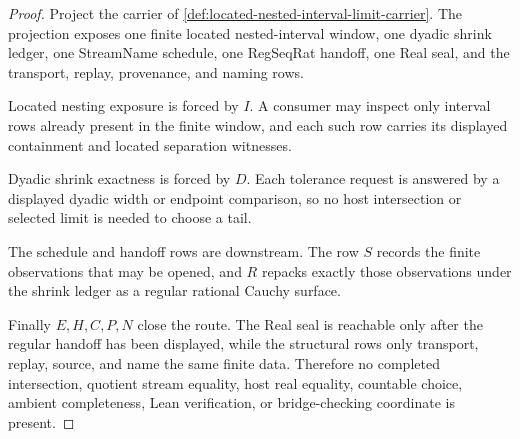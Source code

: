 \begin{proof}
Project the carrier of \autoref{def:located-nested-interval-limit-carrier}. The projection exposes one finite located nested-interval window, one dyadic shrink ledger, one StreamName schedule, one RegSeqRat handoff, one Real seal, and the transport, replay, provenance, and naming rows.

Located nesting exposure is forced by $I$. A consumer may inspect only interval rows already present in the finite window, and each such row carries its displayed containment and located separation witnesses.

Dyadic shrink exactness is forced by $D$. Each tolerance request is answered by a displayed dyadic width or endpoint comparison, so no host intersection or selected limit is needed to choose a tail.

The schedule and handoff rows are downstream. The row $S$ records the finite observations that may be opened, and $R$ repacks exactly those observations under the shrink ledger as a regular rational Cauchy surface.

Finally $E,H,C,P,N$ close the route. The Real seal is reachable only after the regular handoff has been displayed, while the structural rows only transport, replay, source, and name the same finite data. Therefore no completed intersection, quotient stream equality, host real equality, countable choice, ambient completeness, Lean verification, or bridge-checking coordinate is present.
\end{proof}

